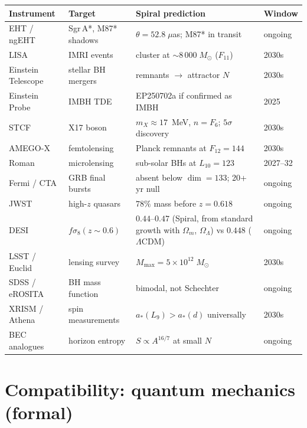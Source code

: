 \documentclass[12pt,a4paper]{article}
\begin{document}
\begin{center}\small
\begin{tabular}{l|l|l|l}
\textbf{Instrument} & \textbf{Target} & \textbf{Spiral prediction} & \textbf{Window} \\
\hline
EHT / ngEHT & Sgr\,A*, M87* shadows & $\theta = 52.8\;\mu$as; M87* in transit & ongoing \\
LISA & IMRI events & cluster at $\sim 8\,000\;M_\odot$ ($F_{11}$) & 2030s \\
Einstein Telescope & stellar BH mergers & remnants $\to$ attractor $N$ & 2030s \\
Einstein Probe & IMBH TDE & EP250702a if confirmed as IMBH & 2025 \\
STCF & X17 boson & $m_X \approx 17$~MeV, $n = F_6$; $5\sigma$ discovery & 2030s \\
AMEGO-X & femtolensing & Planck remnants at $F_{12} = 144$ & 2030s \\
Roman & microlensing & sub-solar BHs at $L_{10} = 123$ & 2027--32 \\
Fermi / CTA & GRB final bursts & absent below $\dim = 133$; 20+ yr null & ongoing \\
JWST & high-$z$ quasars & $78\%$ mass before $z = 0.618$ & ongoing \\
DESI & $f\sigma_8(z \sim 0.6)$ & $0.44$--$0.47$ (Spiral, from standard growth with $\Omega_m$, $\Omega_\Lambda$) vs $0.448$ ($\Lambda$CDM) & ongoing \\
LSST / Euclid & lensing survey & $M_{\max} = 5 \times 10^{12}\;M_\odot$ & 2030s \\
SDSS / eROSITA & BH mass function & bimodal, not Schechter & ongoing \\
XRISM / Athena & spin measurements & $a_*(L_9) > a_*(d)$ universally & 2030s \\
BEC analogues & horizon entropy & $S \propto A^{16/7}$ at small $N$ & ongoing \\
\end{tabular}
\end{center}




\section{Compatibility: quantum mechanics (formal)}
\label{sec:qm-formal}
\label{sec:quantum-mechanics}
\label{sec:qm}
\end{document}
